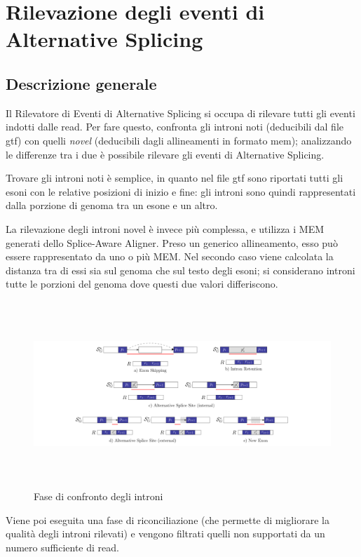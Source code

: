 \section{Rilevazione degli eventi di Alternative Splicing}

\subsection{Descrizione generale}

Il Rilevatore di Eventi di Alternative Splicing si occupa di rilevare tutti gli eventi indotti dalle read. Per fare questo, confronta gli introni noti (deducibili dal file gtf) con quelli \textit{novel} (deducibili dagli allineamenti in formato mem); analizzando le differenze tra i due è possibile rilevare gli eventi di Alternative Splicing.

Trovare gli introni noti è semplice, in quanto nel file gtf sono riportati tutti gli esoni con le relative posizioni di inizio e fine: gli introni sono quindi rappresentati dalla porzione di genoma tra un esone e un altro. 

La rilevazione degli introni novel è invece più complessa, e utilizza i MEM generati dello Splice-Aware Aligner. Preso un generico allineamento, esso può essere rappresentato da uno o più MEM. Nel secondo caso viene calcolata la distanza tra di essi sia sul genoma che sul testo degli esoni; si considerano introni tutte le porzioni del genoma dove questi due valori differiscono.

\begin{figure}[h!]
	\centering
	\includegraphics[width=\linewidth, height=7cm]{images/pattern.png}
  \caption{Fase di confronto degli introni}
  \label{fig:Summary1}
\end{figure}

Viene poi eseguita una fase di riconciliazione (che permette di migliorare la qualità degli introni rilevati) e vengono filtrati quelli non supportati da un numero sufficiente di read.

